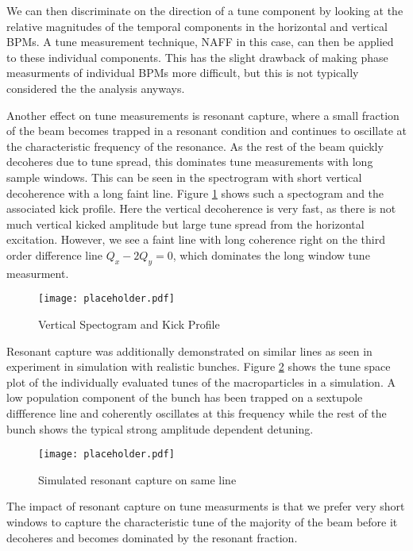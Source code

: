 We can then discriminate on the direction of a tune component by looking at the relative magnitudes of the temporal components in the horizontal and vertical BPMs. A tune measurement technique, NAFF in this case, can then be applied to these individual components. This has the slight drawback of making phase measurments of individual BPMs more difficult, but this is not typically considered the the analysis anyways. 

Another effect on tune measurements is resonant capture, where a small fraction of the beam becomes trapped in a resonant condition and continues to oscillate at the characteristic frequency of the resonance. As the rest of the beam quickly decoheres due to tune spread, this dominates tune measurements with long sample windows. This can be seen in the spectrogram with short vertical decoherence with a long faint line. Figure \ref{fig:specResCap} shows such a spectogram and the associated kick profile. Here the vertical decoherence is very fast, as there is not much vertical kicked amplitude but large tune spread from the horizontal excitation. However, we see a faint line with long coherence right on the third order difference line $Q_x-2Q_y = 0$, which dominates the long window tune measurment.

\begin{figure}
	\centering
	\texttt{[image: placeholder.pdf]}
	\caption{Vertical Spectogram and Kick Profile}
	\label{fig:specResCap}
\end{figure}

Resonant capture was additionally demonstrated on similar lines as seen in experiment in simulation with realistic bunches. Figure \ref{fig:simResCap} shows the tune space plot of the individually evaluated tunes of the macroparticles in a simulation. A low population component of the bunch has been trapped on a sextupole diffference line and coherently oscillates at this frequency while the rest of the bunch shows the typical strong amplitude dependent detuning. 

\begin{figure}
	\centering
	\texttt{[image: placeholder.pdf]}
	\caption{Simulated resonant capture on same line}
	\label{fig:simResCap}
\end{figure}

The impact of resonant capture on tune measurments is that we prefer very short windows to capture the characteristic tune of the majority of the beam before it decoheres and becomes dominated by the resonant fraction.

